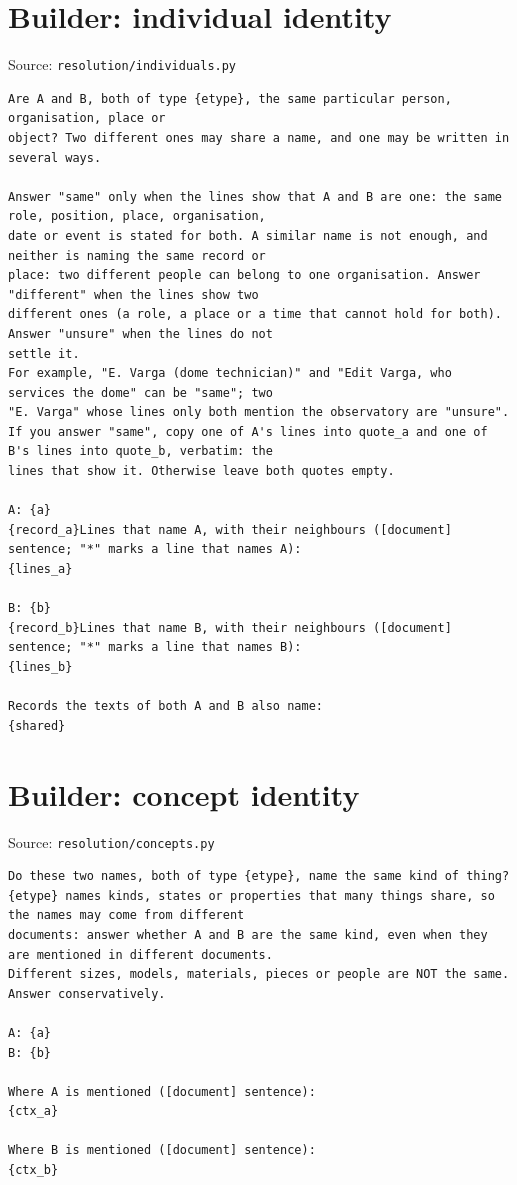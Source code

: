 \section*{Builder: individual identity}
\noindent Source: \texttt{resolution/individuals.py}
\begin{lstlisting}
Are A and B, both of type {etype}, the same particular person, organisation, place or
object? Two different ones may share a name, and one may be written in several ways.

Answer "same" only when the lines show that A and B are one: the same role, position, place, organisation,
date or event is stated for both. A similar name is not enough, and neither is naming the same record or
place: two different people can belong to one organisation. Answer "different" when the lines show two
different ones (a role, a place or a time that cannot hold for both). Answer "unsure" when the lines do not
settle it.
For example, "E. Varga (dome technician)" and "Edit Varga, who services the dome" can be "same"; two
"E. Varga" whose lines only both mention the observatory are "unsure".
If you answer "same", copy one of A's lines into quote_a and one of B's lines into quote_b, verbatim: the
lines that show it. Otherwise leave both quotes empty.

A: {a}
{record_a}Lines that name A, with their neighbours ([document] sentence; "*" marks a line that names A):
{lines_a}

B: {b}
{record_b}Lines that name B, with their neighbours ([document] sentence; "*" marks a line that names B):
{lines_b}

Records the texts of both A and B also name:
{shared}
\end{lstlisting}

\section*{Builder: concept identity}
\noindent Source: \texttt{resolution/concepts.py}
\begin{lstlisting}
Do these two names, both of type {etype}, name the same kind of thing?
{etype} names kinds, states or properties that many things share, so the names may come from different
documents: answer whether A and B are the same kind, even when they are mentioned in different documents.
Different sizes, models, materials, pieces or people are NOT the same. Answer conservatively.

A: {a}
B: {b}

Where A is mentioned ([document] sentence):
{ctx_a}

Where B is mentioned ([document] sentence):
{ctx_b}
\end{lstlisting}

